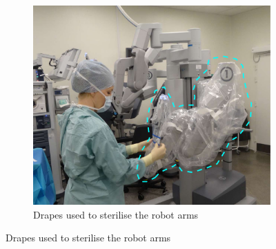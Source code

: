 \documentclass[conference]{IEEEtran}
\begin{document}
\begin{figure}
	\centering
	\begin{subfigure}[b]{0.48\textwidth}
		\includegraphics[width=\textwidth]{Figures/drapes.pdf}
		\caption{Drapes used to sterilise the robot arms}
		\label{fig:drapes}
	\end{subfigure}	
	

\end{figure}
\end{document}
